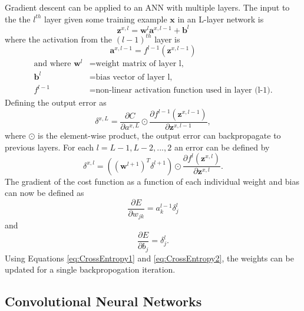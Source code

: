 Gradient descent can be applied to an ANN with multiple layers. The input to the the $l^{th}$ layer given some training example $\boldsymbol{x}$ in an L-layer network is 
\begin{equation}
\boldsymbol{z}^{x,l} = \boldsymbol{w}^{l}  \boldsymbol{a}^{x,l-1} + \boldsymbol{b}^{l}
\end{equation}
%
where the activation from the $(l-1)^{th}$ layer is
%
\begin{equation}
\boldsymbol{a}^{x,l-1} = f^{l-1}(\boldsymbol{z}^{x,l-1})
\end{equation}
\begin{align*}
  \text{and where } \boldsymbol{w}^{l} &= \text{weight matrix of layer l,} \\
  \boldsymbol{b}^{l} &= \text{bias vector of layer l,} \\
  f^{l-1} &= \text{non-linear activation function used in layer (l-1).}
\end{align*}
%
Defining the output error as 
%
\begin{equation}
\delta^{x,L} = \frac{\partial C}{\partial a^{x,L}} \odot \frac{\partial f^{l-1}(\boldsymbol{z}^{x,l-1}) }{\partial \boldsymbol{z}^{x,l-1}}, 
\end{equation}
%
where $\odot$ is the element-wise product, the output error can backpropagate to previous layers. For each $l=L-1,L-2,...,2$ an error can be defined by
%
\begin{equation}
\delta^{x,l} = ((\boldsymbol{w}^{l+1})^T \delta^{l+1}) \odot \frac{\partial f^{l}(\boldsymbol{z}^{x,l}) }{\partial \boldsymbol{z}^{x,l}}.
\end{equation}
%
The gradient of the cost function as a function of each individual weight and bias can now be defined as 
%
\begin{equation} \label{eq:CrossEntropy1}
\frac{\partial E}{\partial w_{jk}} = a^{l-1}_k \delta^l_j
\end{equation}
%
and 
%
\begin{equation} \label{eq:CrossEntropy2}
\frac{\partial E}{\partial b_j} = \delta^l_j.
\end{equation}
%
Using Equations \ref{eq:CrossEntropy1} and \ref{eq:CrossEntropy2}, the weights can be updated for a single backpropogation iteration. 


\subsection{Convolutional Neural Networks}

